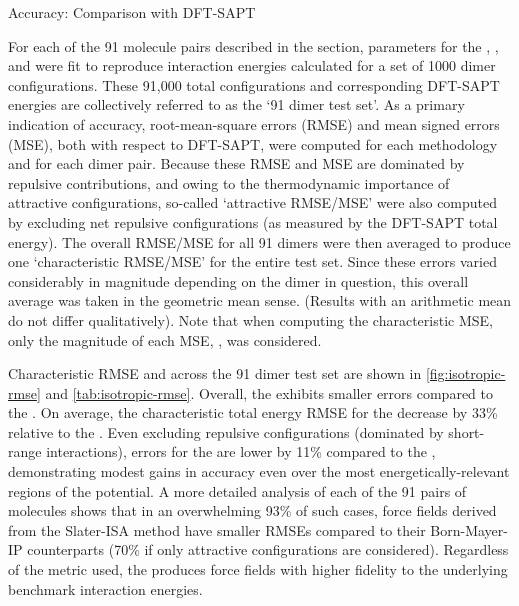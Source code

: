 \begin{subsection}{Accuracy: Comparison with DFT-SAPT}

For each of the 91 molecule pairs described in the  section, 
parameters for the \isaffold, \saptff, and \ljff
were fit to reproduce \saptpbeo interaction energies calculated for a set of 1000 dimer
configurations. These 91,000 total configurations and corresponding DFT-SAPT
energies are collectively referred to as the `91 dimer test set'.  As a
primary indication of accuracy, root-mean-square errors (RMSE) and mean signed
errors (MSE), both with respect to DFT-SAPT, were computed for each
methodology and for each dimer pair. Because these RMSE and MSE are dominated by
repulsive contributions, and owing to the thermodynamic importance of
attractive configurations, so-called `attractive RMSE/MSE' were also computed by
excluding net repulsive configurations (as measured by the DFT-SAPT total energy). 
The overall RMSE/MSE for all 91 dimers were then
averaged to produce one `characteristic RMSE/MSE' for the entire test set.  Since
these errors varied considerably in magnitude depending on the dimer in
question, this overall average was taken in the geometric mean sense. (Results
with an arithmetic mean do not differ qualitatively). Note that when computing
the characteristic MSE, only the magnitude of each MSE, \mse, was considered.

Characteristic RMSE and \mse across the 91 dimer test set are shown in \cref{fig:isotropic-rmse}
and \cref{tab:isotropic-rmse}.  Overall, the \isaffold exhibits smaller errors compared
to the \saptff. On average, the characteristic total energy RMSE for the \isaffold
decrease by 33\% relative to the \saptff.  Even excluding repulsive configurations
(dominated by short-range interactions), errors for the \isaffold are lower by 11\%
compared to the \saptff, demonstrating modest gains in accuracy even over the most
energetically-relevant regions of the potential.  
A more detailed analysis of each of the 91 pairs of molecules shows that in an
overwhelming 93\% of such cases, force fields
derived from the Slater-ISA method have smaller RMSEs compared to their
Born-Mayer-IP counterparts (70\% if only attractive configurations are
considered). Regardless of the metric used, the \isaffold produces force
fields with higher fidelity to the underlying benchmark interaction energies.


\end{subsection}
